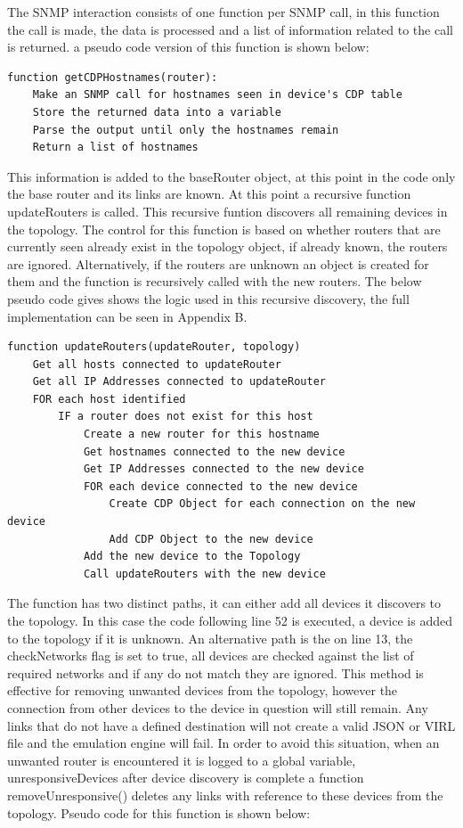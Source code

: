 \documentclass[11pt]{report}
\begin{document}
The SNMP interaction consists of one function per SNMP call, in this function the call is made, the data is processed and a list of information related to the call is returned. a pseudo code version of this function is shown below:

\begin{lstlisting}
function getCDPHostnames(router):
	Make an SNMP call for hostnames seen in device's CDP table
	Store the returned data into a variable
	Parse the output until only the hostnames remain
	Return a list of hostnames
\end{lstlisting}

This information is added to the baseRouter object, at this point in the code only the base router and its links are known. At this point a recursive function updateRouters is called. This recursive funtion discovers all remaining devices in the topology. The control for this function is based on whether routers that are currently seen already exist in the topology object, if already known, the routers are ignored. Alternatively, if the routers are unknown an object is created for them and the function is recursively called with the new routers. The below pseudo code gives shows the logic used in this recursive discovery, the full implementation can be seen in Appendix B.
\pagebreak
\begin{lstlisting}
function updateRouters(updateRouter, topology)
	Get all hosts connected to updateRouter
	Get all IP Addresses connected to updateRouter
	FOR each host identified
		IF a router does not exist for this host
			Create a new router for this hostname
			Get hostnames connected to the new device
			Get IP Addresses connected to the new device
			FOR each device connected to the new device
				Create CDP Object for each connection on the new device
				Add CDP Object to the new device
			Add the new device to the Topology
			Call updateRouters with the new device
\end{lstlisting}

The function has two distinct paths, it can either add all devices it discovers to the topology. In this case the code following line 52 is executed, a device is added to the topology if it is unknown. An alternative path is the on line 13, the checkNetworks flag is set to true, all devices are checked against the list of required networks and if any do not match they are ignored. This method is effective for removing unwanted devices from the topology, however the connection from other devices to the device in question will still remain. Any links that do not have a defined destination will not create a valid JSON or VIRL file and the emulation engine will fail. In order to avoid this situation, when an unwanted router is encountered it is logged to a global variable, unresponsiveDevices after device discovery is complete a function removeUnresponsive() deletes any links with reference to these devices from the topology. Pseudo code for this function is shown below:
\end{document}
